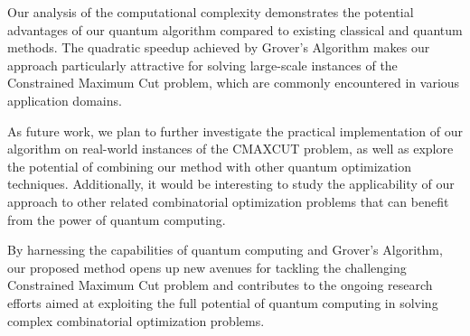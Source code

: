 Our analysis of the computational complexity demonstrates the potential advantages of our quantum algorithm compared to existing classical and quantum methods. The quadratic speedup achieved by Grover's Algorithm makes our approach particularly attractive for solving large-scale instances of the Constrained Maximum Cut problem, which are commonly encountered in various application domains.

As future work, we plan to further investigate the practical implementation of our algorithm on real-world instances of the CMAXCUT problem, as well as explore the potential of combining our method with other quantum optimization techniques. Additionally, it would be interesting to study the applicability of our approach to other related combinatorial optimization problems that can benefit from the power of quantum computing.

By harnessing the capabilities of quantum computing and Grover's Algorithm, our proposed method opens up new avenues for tackling the challenging Constrained Maximum Cut problem and contributes to the ongoing research efforts aimed at exploiting the full potential of quantum computing in solving complex combinatorial optimization problems.

